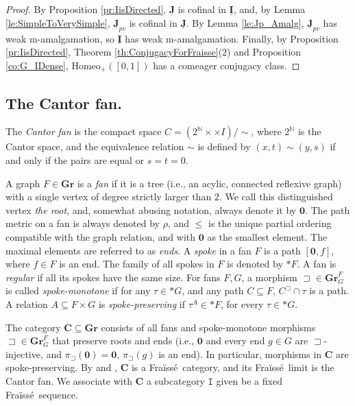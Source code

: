 \documentclass[12pt]{amsart}
\numberwithin{equation}{section}
\theoremstyle{plain}
\theoremstyle{definition}
\newcommand \Homeo{ \mbox{Homeo}}
\newcommand \sqsp{\sqsupset}
\newcommand \rt{\mathbf{0}}
\newcommand \fra{Fra\"{i}ss\'{e}}
\newcommand \CCb{\mathbf{C}}
\newcommand \GGRb{\mathbf{Gr}}
\newcommand \IIub{\underline{\mathbf{I}}}
\newcommand \JJub{\underline{\mathbf{J}}}
\newcommand \NN{\mathbb{N}}
\newcommand \It{\mathtt{I}}
\begin{document}
\begin{proof}
By Proposition \ref{pr:IisDirected}, $\JJub$ is cofinal in $\IIub$, and, by Lemma \ref{le:SimpleToVerySimple}, $\JJub_{pv}$ is cofinal in $\JJub$. By Lemma \ref{le:Jp_Amalg}, $\JJub_{pv}$ has weak m-amalgamation, so $\IIub$ has weak m-amalgamation.  Finally, by Proposition \ref{pr:IisDirected}, Theorem \ref{th:ConjugacyForFraisse}(2) and Proposition \ref{co:G_IDense}, $\Homeo_+([0,1])$ has a comeager conjugacy class.
\end{proof}

\subsection{The Cantor fan.} 

The \emph{Cantor fan} is the compact space $C = (2^\NN×\times I)/ \sim $, where $2^\NN$ is the Cantor space, and the equivalence relation $\sim$ is defined by $(x,t) \sim (y,s)$ if and only if the pairs are equal or $s= t= 0$. 

A graph $F \in \GGRb$ is a \emph{fan} if it is a tree (i.e., an acylic, connected reflexive graph) with a single vertex of degree strictly larger than $2$. We call this distinguished vertex \emph{the root}, and, somewhat abusing notation, always denote it by $\rt$. The path metric on a fan is always denoted by $\rho$, and $\leq$ is the unique partial ordering compatible with the graph relation, and with $\rt$ as the smallest element. The maximal elements are referred to as \emph{ends}. A \emph{spoke} in a fan $F$ is a path $[\rt,f]$,  where $f \in F$ is an end. The family of all spokes in $F$ is denoted by $*F$. A fan is \emph{regular} if all its spokes have the same size. For fans $F, G$, a morphism ${\sqsp} \in  \GGRb^F_G$ is called \emph{spoke-monotone} if for any $\tau \in *G$, and any path $C \subseteq F$, $C^\sqsp \cap \tau$ is a path. A relation $A \subseteq F \times G$ is \emph{spoke-preserving} if $\tau^A \in *F$, for every $\tau \in *G$.

The category $\CCb \subseteq \GGRb$ consists of all fans and spoke-monotone morphisms $\sqsp \in \GGRb^F_G$ that preserve roots and ends (i.e., $\rt$ and every end $g \in G$ are $\sqsp$-injective, and $\pi_\sqsp(\rt)=\rt$, $\pi_\sqsp(g)$ is an end). In particular, morphisms in $\CCb$ are spoke-preserving. By \cite[Proposition 5.29]{BaBiVi2} and \cite[Theorem 5.39]{BaBiVi2}, $\CCb$ is a \fra \ category, and its \fra \ limit is the Cantor fan. We associate with $\CCb$ a subcategory $\It$ given be a fixed \fra \ sequence.
\end{document}
